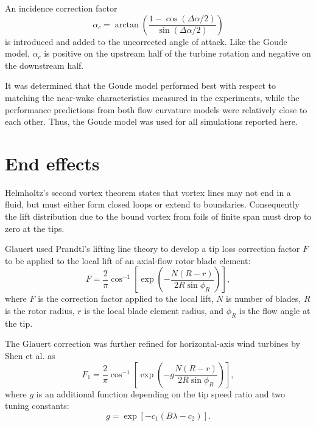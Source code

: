 An incidence correction factor
\begin{equation}
    \alpha_c = \arctan \left( \frac{1 - \cos (\Delta \alpha / 2)}{\sin (\Delta
        \alpha / 2)} \right)
    \label{eq:Mandal-Burton-alpha-corr}
\end{equation}
is introduced and added to the uncorrected angle of attack. Like the Goude
model, $\alpha_c$ is positive on the upstream half of the turbine rotation and
negative on the downstream half. 

It was determined that the Goude model performed best with respect to matching
the near-wake characteristics measured in the experiments, while the performance
predictions from both flow curvature models were relatively close to each other.
Thus, the Goude model was used for all simulations reported here.


\section{End effects}

Helmholtz's second vortex theorem states that vortex lines may not end in a
fluid, but must either form closed loops or extend to boundaries. Consequently
the lift distribution due to the bound vortex from foils of finite span must
drop to zero at the tips.

Glauert\cite{Glauert1935} used Prandtl's lifting line theory \cite{Prandtl1927}
to develop a tip loss correction factor $F$ to be applied to the local lift of
an axial-flow rotor blade element:
\begin{equation}
    F = \frac{2}{\pi} \cos^{-1} \left[ \exp \left( - \frac{N (R-r)}{2R \sin
        \phi_R} \right) \right],
\end{equation}
where $F$ is the correction factor applied to the local lift, $N$ is number of
blades, $R$ is the rotor radius, $r$ is the local blade element radius, and
$\phi_R$ is the flow angle at the tip.

The Glauert correction was further refined for horizontal-axis wind turbines by
Shen et al. \cite{Shen2005a} as
\begin{equation}
    F_1 = \frac{2}{\pi} \cos^{-1} \left[ \exp \left( -g \frac{N (R-r)}{2R \sin
    \phi_R} \right) \right],
\end{equation}
where $g$ is an additional function depending on the tip speed ratio and two
tuning constants:
\begin{equation}
    g = \exp [ -c_1 (B \lambda - c_2) ].
\end{equation}

